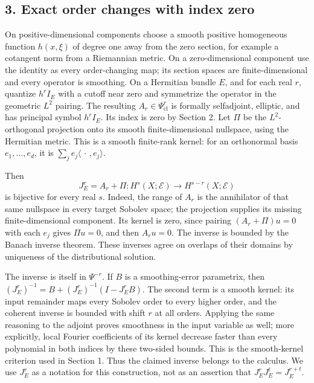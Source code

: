 \documentclass[
  11pt,
]{article}
\makeatletter
\let\ReaderOriginalAnchorStart\hyper@anchorstart
\let\ReaderOriginalAnchorEnd\hyper@anchorend
\let\ReaderPendingAliases\@empty
\def\ReaderArmAliases#1{\gdef\ReaderPendingAliases{#1}}
\def\hyper@anchorstart#1{\ReaderIfNativeAnchorTF{#1}{\ReaderPendingAliases\global\let\ReaderPendingAliases\@empty}{}\ReaderOriginalAnchorStart{#1}}
\makeatother
\begin{document}
\ReaderArmAliases{\ReaderOriginalAnchorStart{AN03-GSI-003}\ReaderOriginalAnchorEnd\begingroup\expandafter\def\csname @currentHref\endcsname{AN03-GSI-003}\label{AN03-GSI-003}\endgroup\ReaderOriginalAnchorStart{an03-gsi-003-exact-order-changes-with-index-zero}\ReaderOriginalAnchorEnd\begingroup\expandafter\def\csname @currentHref\endcsname{an03-gsi-003-exact-order-changes-with-index-zero}\label{an03-gsi-003-exact-order-changes-with-index-zero}\endgroup\ReaderOriginalAnchorStart{3-exact-order-changes-with-index-zero}\ReaderOriginalAnchorEnd\begingroup\expandafter\def\csname @currentHref\endcsname{3-exact-order-changes-with-index-zero}\label{3-exact-order-changes-with-index-zero}\endgroup}
\subsection{3. Exact order changes with index
zero}\label{exact-order-changes-with-index-zero}

On positive-dimensional components choose a smooth positive homogeneous
function \(h(x,\xi)\) of degree one away from the zero section, for
example a cotangent norm from a Riemannian metric. On a zero-dimensional
component use the identity as every order-changing map; its section
spaces are finite-dimensional and every operator is smoothing. On a
Hermitian bundle \(E\), and for each real \(r\), quantize \(h^r I_E\)
with a cutoff near zero and symmetrize the operator in the geometric
\(L^2\) pairing. The resulting \(A_r\in\Psi^r_{\mathrm{cl}}\) is
formally selfadjoint, elliptic, and has principal symbol \(h^rI_E\). Its
index is zero by Section 2. Let \(\Pi\) be the \(L^2\)-orthogonal
projection onto its smooth finite-dimensional nullspace, using the
Hermitian metric. This is a smooth finite-rank kernel: for an
orthonormal basis \(e_1,\ldots,e_d\), it is
\(\sum_j e_j\langle\,\cdot\,,e_j\rangle\).

Then \[
J_E^r=A_r+\Pi:H^s(X;\mathcal E)\longrightarrow H^{s-r}(X;\mathcal E)
\tag{I9}
\] is bijective for every real \(s\). Indeed, the range of \(A_r\) is
the annihilator of that same nullspace in every target Sobolev space;
the projection supplies its missing finite-dimensional component. Its
kernel is zero, since pairing \((A_r+\Pi)u=0\) with each \(e_j\) gives
\(\Pi u=0\), and then \(A_ru=0\). The inverse is bounded by the Banach
inverse theorem. These inverses agree on overlaps of their domains by
uniqueness of the distributional solution.

The inverse is itself in \(\Psi^{-r}\). If \(B\) is a smoothing-error
parametrix, then \((J_E^r)^{-1}=B+(J_E^r)^{-1}(I-J_E^rB)\). The second
term is a smooth kernel: its input remainder maps every Sobolev order to
every higher order, and the coherent inverse is bounded with shift \(r\)
at all orders. Applying the same reasoning to the adjoint proves
smoothness in the input variable as well; more explicitly, local Fourier
coefficients of its kernel decrease faster than every polynomial in both
indices by these two-sided bounds. This is the smooth-kernel criterion
used in Section 1. Thus the claimed inverse belongs to the calculus. We
use \(J_E^r\) as a notation for this construction, not as an assertion
that \(J_E^rJ_E^t=J_E^{r+t}\).
\end{document}
